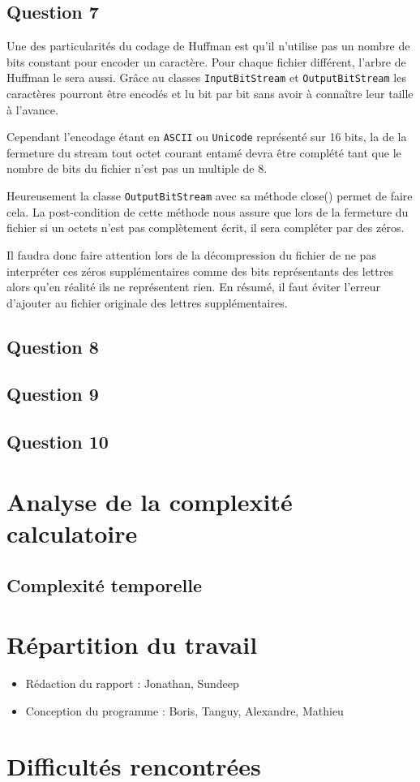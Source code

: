 \documentclass[11pt]{article}
\begin{document}
\subsection*{Question 7}
Une des particularités du codage de Huffman est qu'il n'utilise pas un nombre de bits constant pour encoder un caractère. Pour chaque fichier différent, l'arbre de Huffman le sera aussi. Grâce au classes \verb+InputBitStream+ et \verb+OutputBitStream+ les caractères pourront être encodés et lu bit par bit sans avoir à connaître leur taille à l'avance.

Cependant l'encodage étant en \verb+ASCII+ ou \verb+Unicode+ représenté sur 16 bits, la de la fermeture du stream tout octet courant entamé devra être complété tant que le nombre de bits du fichier n'est pas un multiple de 8.

Heureusement la classe \verb+OutputBitStream+ avec sa méthode close() permet de faire cela. La post-condition de cette méthode nous assure que lors de la fermeture du fichier si un octets n'est pas complètement écrit, il sera compléter par des zéros.

Il faudra donc faire attention lors de la décompression du fichier de ne pas interpréter ces zéros supplémentaires comme des bits représentants des lettres alors qu'en réalité ils ne représentent rien. En résumé, il faut éviter l'erreur d'ajouter au fichier originale des lettres supplémentaires.

\subsection*{Question 8}

\subsection*{Question 9}

\subsection*{Question 10}


\section{Analyse de la complexité calculatoire}
\subsection{Complexité temporelle}

\section{Répartition du travail}

\begin{itemize}
\item Rédaction du rapport : Jonathan, Sundeep
\item Conception du programme : Boris, Tanguy, Alexandre, Mathieu
\end{itemize}

\section{Difficultés rencontrées}
\end{document}
